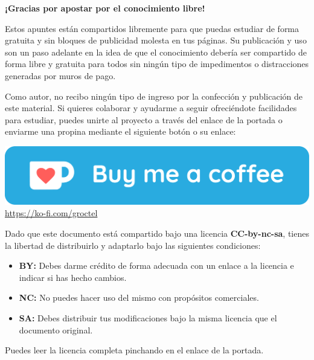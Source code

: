 \begin{titlepage}


\thispagestyle{empty}

\vspace*{\fill}

\begin{center}
	\textbf{\Huge{¡Gracias por apostar por el conocimiento libre!}}
\end{center}

\vspace{1cm}

Estos apuntes están compartidos libremente para que puedas estudiar de forma gratuita y sin bloques de publicidad molesta en tus páginas.
Su publicación y uso son un paso adelante en la idea de que el conocimiento debería ser compartido de forma libre y gratuita para todos sin ningún tipo de impedimentos o distracciones generadas por muros de pago.

Como autor, no recibo ningún tipo de ingreso por la confección y publicación de este material.
Si quieres colaborar y ayudarme a seguir ofreciéndote facilidades para estudiar, puedes unirte al proyecto a través del enlace de la portada o enviarme una propina mediante el siguiente botón o su enlace:

\vspace{0.5cm}

\begin{center}
	\href{https://ko-fi.com/groctel}{\includegraphics[scale=0.15]{RecursosTeX/BuyMeACoffee_blue-2x.pdf}}
	\url{https://ko-fi.com/groctel}
\end{center}

\vspace{0.5cm}

Dado que este documento está compartido bajo una licencia \textbf{CC-by-nc-sa}, tienes la libertad de distribuirlo y adaptarlo bajo las siguientes condiciones:

\begin{itemize}
	\item\textbf{BY:} Debes darme crédito de forma adecuada con un enlace a la licencia e indicar si has hecho cambios.
	\item\textbf{NC:} No puedes hacer uso del mismo con propósitos comerciales.
	\item\textbf{SA:} Debes distribuir tus modificaciones bajo la misma licencia que el documento original.
\end{itemize}

Puedes leer la licencia completa pinchando en el enlace de la portada.

\vspace*{\fill}

\end{titlepage}
